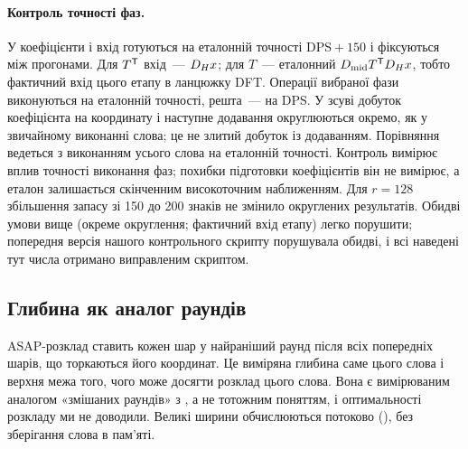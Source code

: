 \documentclass[11pt]{article}
\theoremstyle{plain}
\begin{document}
\paragraph{Контроль точності фаз.}
У  коефіцієнти і вхід готуються на еталонній точності DPS${}+150$ і фіксуються між прогонами. Для $T^{\mathsf{T}}$ вхід~--- $D_H x$; для $T$~--- еталонний $D_{\mathrm{mid}} T^{\mathsf{T}}D_H x$, тобто фактичний вхід цього етапу в ланцюжку DFT. Операції вибраної фази виконуються на еталонній точності, решта~--- на DPS. У зсуві добуток коефіцієнта на координату і наступне додавання округлюються окремо, як у звичайному виконанні слова; це не злитий добуток із додаванням. Порівняння ведеться з виконанням усього слова на еталонній точності. Контроль вимірює вплив точності виконання фаз; похибки підготовки коефіцієнтів він не вимірює, а еталон залишається скінченним високоточним наближенням. Для $r=128$ збільшення запасу зі 150 до 200 знаків не змінило округлених результатів. Обидві умови вище (окреме округлення; фактичний вхід етапу) легко порушити; попередня версія нашого контрольного скрипту порушувала обидві, і всі наведені тут числа отримано виправленим скриптом.

\subsection{Глибина як аналог раундів}\label{sec:asap}
ASAP-розклад ставить кожен шар у найраніший раунд після всіх попередніх шарів, що торкаються його координат. Це виміряна глибина саме цього слова і верхня межа того, чого може досягти розклад цього слова. Вона є вимірюваним аналогом «змішаних раундів» з , а не тотожним поняттям, і оптимальності розкладу ми не доводили. Великі ширини обчислюються потоково (), без зберігання слова в пам'яті.
\end{document}
